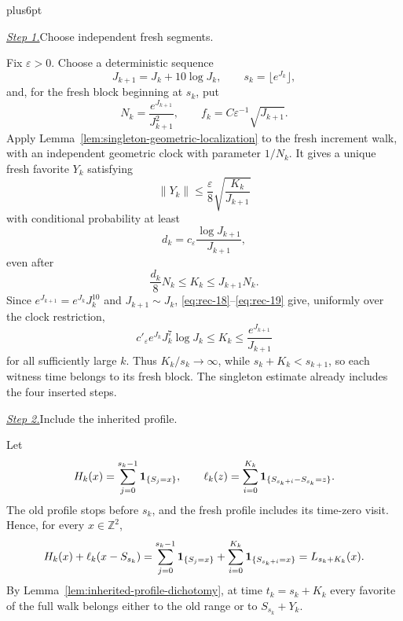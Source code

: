 \documentclass[12pt,reqno]{amsart}
\makeatletter
\theoremstyle{plain}
\theoremstyle{definition}
\theoremstyle{remark}
\renewenvironment{proof}[1][\proofname]{%
  \par
  \pushQED{\qed}%
  \normalfont
  \topsep6pt plus6pt\relax
  \trivlist
  \item[\hskip\labelsep\slshape #1\@addpunct{.}]%
  \ignorespaces
}{%
  \popQED
  \endtrivlist
  \@endpefalse
}
\DeclareRobustCommand{\qed}{%
  \leavevmode\unskip\penalty9999\hbox{}\nobreak
  \ifmmode
    \makebox[0pt][l]{\qquad\hbox{\qedsymbol}}%
  \else
    \qquad\hbox{\qedsymbol}%
  \fi
}
\renewcommand{\qedsymbol}{\rule[.47pt]{4pt}{6pt}}
\numberwithin{equation}{section}
\makeatother
\begin{document}
\begin{proof}
\smallskip\noindent\underline{\textit{Step 1.}}\quad Choose independent fresh segments.

Fix \(\varepsilon>0\).  Choose a deterministic sequence
\[
       J_{k+1}=J_k+10\log J_k,\qquad s_k=\lfloor e^{J_k}\rfloor,
\]
and, for the fresh block beginning at \(s_k\), put
\[
       N_k=\frac{e^{J_{k+1}}}{J_{k+1}^2},\qquad
       f_k=C\varepsilon^{-1}\sqrt{J_{k+1}}.
\]
Apply Lemma~\ref{lem:singleton-geometric-localization} to the fresh increment
walk, with an independent geometric clock with parameter $1/N_k$.  It gives a
unique fresh favorite \(Y_k\) satisfying
\begin{equation}
\lVert Y_k\rVert\le\frac{\varepsilon}{8}
             \sqrt{\frac{K_k}{J_{k+1}}}                       \label{eq:rec-17}
\end{equation}
with conditional probability at least
\begin{equation}
d_k=c_\varepsilon\frac{\log J_{k+1}}{J_{k+1}},          \label{eq:rec-18}
\end{equation}
even after
\begin{equation}
\frac{d_k}{8}N_k\le K_k\le J_{k+1}N_k.                 \label{eq:rec-19}
\end{equation}
Since $e^{J_{k+1}}=e^{J_k}J_k^{10}$ and $J_{k+1}\sim J_k$,
\eqref{eq:rec-18}--\eqref{eq:rec-19} give, uniformly over the clock restriction,
\[
 c'_{\varepsilon}e^{J_k}J_k^7\log J_k
 \le K_k\le\frac{e^{J_{k+1}}}{J_{k+1}}
\]
for all sufficiently large $k$. Thus $K_k/s_k\to\infty$, while
$s_k+K_k<s_{k+1}$, so each witness time belongs to its fresh block.
The singleton estimate already includes the four inserted steps.

\smallskip\noindent\underline{\textit{Step 2.}}\quad Include the inherited profile.

Let
\[
 H_k(x)=\sum_{j=0}^{s_k-1}{\bf1}_{\{S_j=x\}},\qquad
 \ell_k(z)=\sum_{i=0}^{K_k}
       {\bf1}_{\{S_{s_k+i}-S_{s_k}=z\}}.
\]
The old profile stops before $s_k$, and the fresh profile includes its
time-zero visit. Hence, for every $x\in\mathbb Z^2$,
\[
 H_k(x)+\ell_k(x-S_{s_k})
 =\sum_{j=0}^{s_k-1}{\bf1}_{\{S_j=x\}}
   +\sum_{i=0}^{K_k}{\bf1}_{\{S_{s_k+i}=x\}}
 =L_{s_k+K_k}(x).
\]
By
Lemma~\ref{lem:inherited-profile-dichotomy}, at time
\(t_k=s_k+K_k\) every favorite of the full walk belongs either to the old
range or to \(S_{s_k}+Y_k\).


\end{proof}
\end{document}
